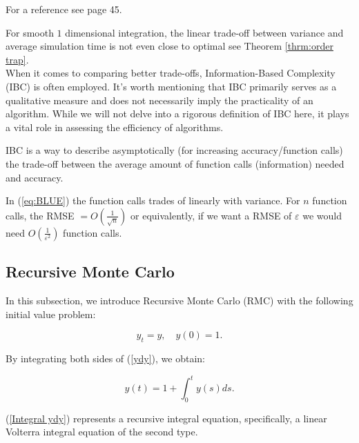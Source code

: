 \documentclass[a4paper,12pt]{article}
\begin{document}
\begin{related}
    For a reference see \cite{veach_robust_1997} page 45.
\end{related}

For smooth $1$ dimensional integration, the linear trade-off between
variance and average simulation time is not even close to optimal see
Theorem \ref{thrm:order trap}. \\
When it comes to comparing better trade-offs,
Information-Based Complexity (IBC) is often employed.
It's worth mentioning that IBC primarily serves as a
qualitative measure and does not necessarily imply the
practicality of an algorithm. While we will not delve into a
rigorous definition of IBC here, it plays a vital role in
assessing the efficiency of algorithms.

\begin{definition}
    IBC is a way to describe asymptotically (for increasing accuracy/function calls)
    the trade-off between the average amount of function calls (information)
    needed and accuracy.
\end{definition}

\begin{example}
    In (\ref{eq:BLUE}) the function calls trades of
    linearly with variance. For $n$ function calls,
    the RMSE $= O\left(\frac{1}{\sqrt{n}}\right)$ or equivalently, if we want a
    RMSE of $\varepsilon$ we would need $O\left(\frac{1}{\varepsilon^{2}}\right)$
    function calls.
\end{example}


\subsection{Recursive Monte Carlo}
In this subsection, we introduce Recursive Monte Carlo (RMC)
with the following  initial value problem:


\begin{equation} \label{ydy}
    y_t = y, \quad y(0) = 1.
\end{equation}


By integrating both sides of (\ref{ydy}), we obtain:

\begin{equation} \label{Integral ydy}
    y(t) = 1 + \int_{0}^{t} y(s) ds.
\end{equation}

(\ref{Integral ydy}) represents a recursive integral equation,
specifically, a linear Volterra integral equation of the second type.
\end{document}
